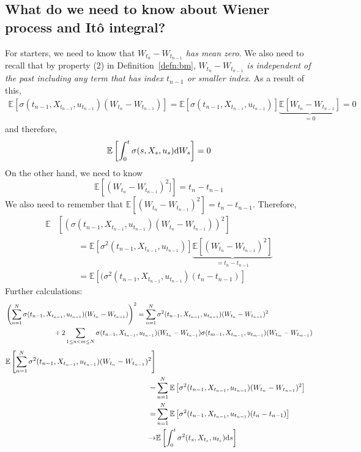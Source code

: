 \documentclass[11pt]{book}
\newcommand{\ds}{\text{\normalfont d}s}
\newcommand{\dW}{\text{\normalfont d}W}
\begin{document}
\subsection{What do we need to know about Wiener process and Itô integral?}
\label{sec:toknow_Wiener}
For starters, we need to know that \emph{$W_{t_{n}}-W_{t_{n-1}}$ has mean zero}. 
We also need to recall that by property (2) in Definition~\ref{defn:bm}, \emph{$W_{t_{n}}-W_{t_{n-1}}$ is independent of the past including any term that has index $t_{n-1}$ or smaller index}.
As a result of this, 
\[
\begin{split}
    \mathbb{E}\left[\sigma(t_{n-1},X_{t_{n-1}},u_{t_{n-1}})(W_{t_{n}}-W_{t_{n-1}})\right]=\mathbb{E}\left[\sigma(t_{n-1},X_{t_{n-1}},u_{t_{n-1}})\right]\underbrace{\mathbb{E}\left[W_{t_{n}}-W_{t_{n-1}}\right]}_{=0}=0
\end{split}
\]
and therefore, 
\[
\mathbb{E}\left[\int_0^t \sigma(s,X_s,u_s)\dW_s\right]=0
\]
On the other hand, we need to know 
\[
\mathbb{E}\left[(W_{t_{n}}-W_{t_{n-1}})^2]\right]=t_n-t_{n-1}
\]
We also need to remember that \emph{$\mathbb{E}\left[(W_{t_{n}}-W_{t_{n-1}})^2\right]=t_{n}-t_{n-1}$}.
Therefore, 
\[
\begin{split}
    \mathbb{E}&\left[\left(\sigma(t_{n-1},X_{t_{n-1}},u_{t_{n-1}})(W_{t_{n}}-W_{t_{n-1}})\right)^2\right]\\
    &\hspace{1cm}=\mathbb{E}\left[\sigma^2(t_{n-1},X_{t_{n-1}},u_{t_{n-1}})\right]\underbrace{\mathbb{E}\left[(W_{t_{n}}-W_{t_{n-1}})^2\right]}_{=t_{n}-t_{n-1}}\\
    &\hspace{1cm}=\mathbb{E}\left[(\sigma^2(t_{n-1},X_{t_{n-1}},u_{t_{n-1}})(t_{n}-t_{n-1})\right]
\end{split}
\]
Further calculations:
\[
\begin{split}
    &\left(\sum_{n=1}^{N} \sigma(t_{n-1},X_{t_{n-1}},u_{t_{n-1}})(W_{t_{n}}-W_{t_{n-1}})\right)^2=  \sum_{n=1}^{N} \sigma^2(t_{n-1},X_{t_{n-1}},u_{t_{n-1}})(W_{t_{n}}-W_{t_{n-1}})^2\\
    &\hspace{2.5cm}+2\sum_{1\le n<m\le N} \sigma(t_{n-1},X_{t_{n-1}},u_{t_{n-1}})(W_{t_{n}}-W_{t_{n-1}})\sigma(t_{m-1},X_{t_{m-1}},u_{t_{m-1}})(W_{t_{m}}-W_{t_{m-1}})
\end{split}
\]
\[
\begin{split}
    \mathbb{E}\left[\sum_{n=1}^{N} \sigma^2(t_{n-1},X_{t_{n-1}},u_{t_{n-1}})(W_{t_{n}}-W_{t_{n-1}})^2\right] 
    \\
    = &\sum_{n=1}^{N}\mathbb{E}\left[\sigma^2(t_{n-1},X_{t_{n-1}},u_{t_{n-1}})(W_{t_{n}}-W_{t_{n-1}})^2\right] \\
    = &\sum_{n=1}^{N}\mathbb{E}\left[\sigma^2(t_{n-1},X_{t_{n-1}},u_{t_{n-1}})({t_{n}}-{t_{n-1}})\right]
    \\
    \to &
    \mathbb{E} \left[\int_0^t\sigma^2(t_{s},X_{t_{s}},u_{t_{s}})\ds\right]
\end{split}
\]
\end{document}
